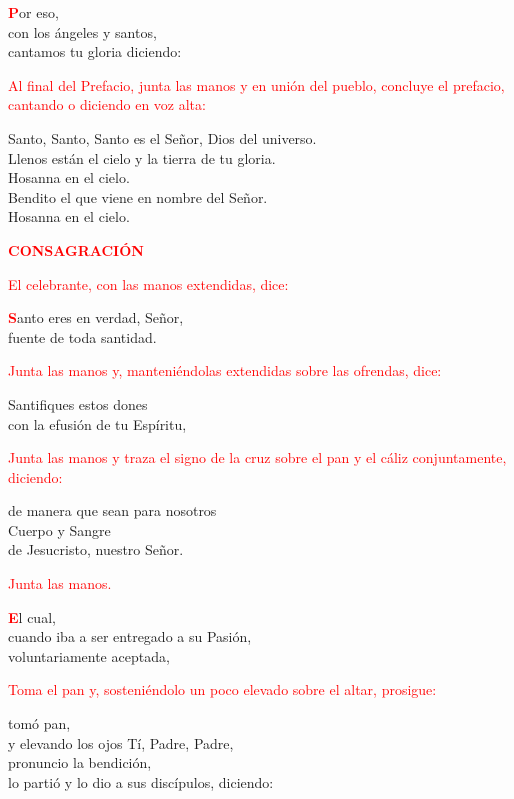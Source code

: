 \documentclass[12pt, letterpaper]{article}
\begin{document}
  \lettrine[lines=2]{\bfseries \textcolor{red}{P}}{}\Large or eso,\\
  con los \'angeles y santos,\\
  cantamos tu gloria diciendo:
      
  \large{\textcolor{red}{Al final del Prefacio, junta las manos y en uni\'on del pueblo, concluye el prefacio, cantando o diciendo en voz alta:}}

  \noindent
  \Large {Santo, Santo, Santo es el Se\~nor, Dios del universo.\\
  Llenos est\'an el cielo y la tierra de tu gloria.\\
  Hosanna en el cielo.\\
  Bendito el que viene en nombre del Se\~nor.\\
  Hosanna en el cielo.}

  \Large {\bfseries \textcolor{red}{CONSAGRACI\'ON}} 

  \large{\textcolor{red}{El celebrante, con las manos extendidas, dice:}}

  \lettrine[lines=2]{\bfseries \textcolor{red}{S}}{}\Large anto eres en verdad, Se\~nor,\\
  fuente de toda santidad.

  \large{\textcolor{red}{Junta las manos y, manteni\'endolas extendidas sobre las ofrendas, dice:}}

  \noindent
  \Large Santifiques estos dones\\
  con la efusi\'on de tu Esp\'iritu,

  \large{\textcolor{red}{Junta las manos y traza el signo de la cruz sobre el pan y el c\'aliz conjuntamente, diciendo:}}

  \noindent
  \Large de manera que sean para nosotros\\
  Cuerpo y \Huge{\textcolor{red}{}} \Large Sangre\\
  de Jesucristo, nuestro Se\~nor.

  \large{\textcolor{red}{Junta las manos.}}

  \lettrine[lines=2]{\bfseries \textcolor{red}{E}}{}\Large l cual,\\
  cuando iba a ser entregado a su Pasi\'on,\\
  voluntariamente aceptada,

  \large{\textcolor{red}{Toma el pan y, sosteni\'endolo un poco elevado sobre el altar, prosigue:}}

  \noindent
  \Large tom\'o pan,\\ 
  y elevando los ojos T\'i, Padre, Padre,\\
  pronuncio la bendici\'on, \\
  lo parti\'o y lo dio a sus disc\'ipulos, diciendo:
\end{document}
